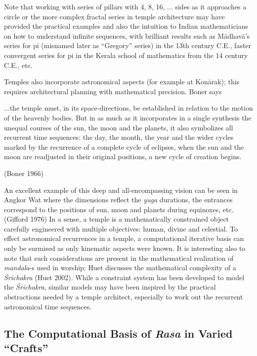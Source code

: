 Note that working with series of pillars with 4, 8, 16, ... sides as it approaches a circle or the more complex fractal series in temple architecture may have provided the practical examples and also the intuition to Indian mathematicians on how to understand infinite sequences, with brilliant results such as Mādhavā’s series for pi (misnamed later as “Gregory” series) in the 13th century C.E., faster convergent series for pi in the Kerala school of mathematics from the 14 century C.E., etc.

Temples also incorporate astronomical aspects (for example at Konārak); this requires architectural planning with mathematical precision. Boner says 

\begin{myquote}
...the temple must, in its space-directions, be established in relation to the motion of the heavenly bodies. But in as much as it incorporates in a single synthesis the unequal courses of the sun, the moon and the planets, it also symbolizes all recurrent time sequences: the day, the month, the year and the wider cycles marked by the recurrence of a complete cycle of eclipses, when the sun and the moon are readjusted in their original positions, a new cycle of creation begins. 

\hfill(Boner 1966)
\end{myquote}

An excellent example of this deep and all-encompassing vision can be seen in Angkor Wat where the dimensions reflect the \textsl{yuga} durations, the entrances correspond to the positions of sun, moon and planets during equinoxes, etc. (Gifford 1976) In a sense, a temple is a mathematically constrained object carefully engineered with multiple objectives: human, divine and celestial. To effect astronomical recurrences in a temple, a computational iterative basis can only be surmised as only kinematic aspects were known. It is interesting also to note that such considerations are present in the mathematical realization of \textsl{mandala}-s used in worship; Huet discusses the mathematical complexity of a \textsl{Śrīchakra} (Huet 2002). While a constraint system has been developed to model the \textsl{Śrīchakra}, similar models may have been inspired by the practical abstractions needed by a temple architect, especially to work out the recurrent astronomical time sequences. 

\subsection{The Computational Basis of \textsl{Rasa} in Varied “Crafts”}\label{chap7-sec5.4}

